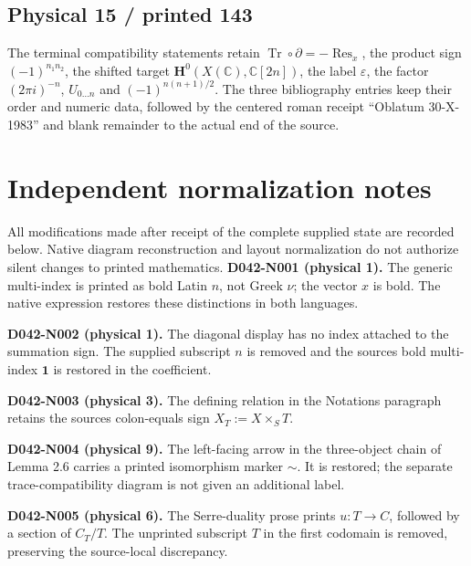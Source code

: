 \documentclass[11pt,leqno]{article}
\DeclareMathOperator{\Res}{Res}
\DeclareMathOperator{\Tr}{Tr}
\newcommand{\CC}{\mathbb C}
\begin{document}
\subsection*{Physical 15 / printed 143}
The terminal compatibility statements retain
$\Tr\circ\partial=-\Res_x$, the product sign $(-1)^{n_1n_2}$,
the shifted target $\mathbf H^0(X(\CC),\CC[2n])$, the label $\varepsilon$,
the factor $(2\pi i)^{-n}$, $U_{0\ldots n}$ and
$(-1)^{n(n+1)/2}$. The three bibliography entries keep their order and
numeric data, followed by the centered roman receipt ``Oblatum 30-X-1983''
and blank remainder to the actual end of the source.

\section*{Independent normalization notes}
All modifications made after receipt of the complete supplied state are recorded
below. Native diagram reconstruction and layout normalization do not authorize
silent changes to printed mathematics.
\noindent\textbf{D042-N001 (physical 1).} The generic multi-index is printed as bold Latin $n$, not Greek $\nu$; the vector $x$ is bold. The native expression restores these distinctions in both languages.\par

\noindent\textbf{D042-N002 (physical 1).} The diagonal display has no index attached to the summation sign. The supplied subscript $n$ is removed and the source\textquotesingle s bold multi-index $\mathbf1$ is restored in the coefficient.\par

\noindent\textbf{D042-N003 (physical 3).} The defining relation in the Notations paragraph retains the source\textquotesingle s colon-equals sign $X_T:=X\times_ST$.\par

\noindent\textbf{D042-N004 (physical 9).} The left-facing arrow in the three-object chain of Lemma 2.6 carries a printed isomorphism marker $\sim$. It is restored; the separate trace-compatibility diagram is not given an additional label.\par

\noindent\textbf{D042-N005 (physical 6).} The Serre-duality prose prints $u:T\to C$, followed by a section of $C_T/T$. The unprinted subscript $T$ in the first codomain is removed, preserving the source-local discrepancy.\par
\end{document}
